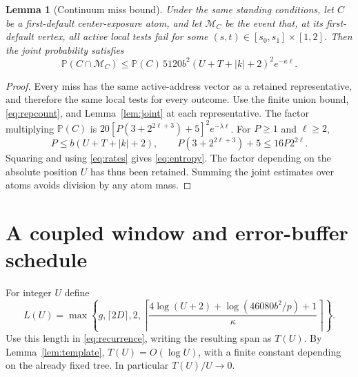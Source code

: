 \documentclass[11pt]{article}
\newtheorem{lemma}[theorem]{Lemma}
\theoremstyle{definition}
\theoremstyle{remark}
\begin{document}
\begin{lemma}[Continuum miss bound]\label{lem:entropy}
Under the same standing conditions, let $C$ be a first-default center-exposure
atom, and let $\mathcal M_C$ be the event that, at its first-default vertex,
all active local tests fail for some $(s,t)\in[s_0,s_1]\times[1,2]$. Then the
joint probability satisfies
\begin{equation}\label{eq:entropy}
 \mathbb P(C\cap\mathcal M_C)
 \leq\mathbb P(C)\,5120 b^2(U+T+|k|+2)^2 e^{-\kappa\ell}.
\end{equation}
\end{lemma}
\begin{proof}
Every miss has the same active-address vector as a retained representative,
and therefore the same local tests for every outcome. Use the finite union
bound, \eqref{eq:repcount}, and Lemma~\ref{lem:joint} at each representative.
The factor multiplying $\mathbb P(C)$ is
$20[P(3+2^{2\ell+3})+5]^2 e^{-\lambda\ell}$.
For $P\geq1$ and $\ell\geq2$,
\[
 P\leq b(U+T+|k|+2),\qquad
 P(3+2^{2\ell+3})+5\leq16P2^{2\ell}.
\]
Squaring and using \eqref{eq:rates} gives \eqref{eq:entropy}.
The factor depending on the absolute position $U$ has thus been retained.
Summing the joint estimates over atoms avoids division by any atom mass.
\end{proof}

\section{A coupled window and error-buffer schedule}\label{sec:schedule}
For integer $U$ define
\begin{equation}\label{eq:Lschedule}
 L(U)=\max\left\{g,\lceil2D\rceil,2,
 \left\lceil\frac{4\log(U+2)+\log(46080b^2/p)+1}{\kappa}\right\rceil\right\}.
\end{equation}
Use this length in \eqref{eq:recurrence}, writing the resulting span as $T(U)$.
By Lemma~\ref{lem:template}, $T(U)=O(\log U)$, with a finite constant depending
on the already fixed tree. In particular $T(U)/U\to0$.
\end{document}
